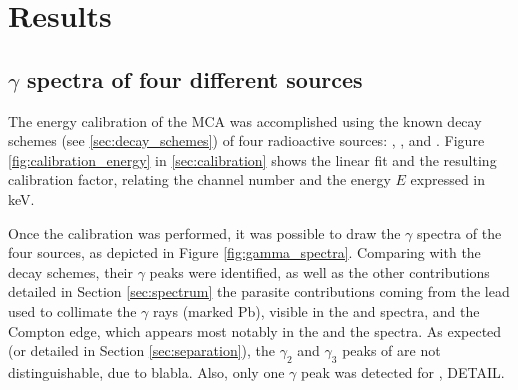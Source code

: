 \section{Results}
\subsection{$\gamma$ spectra of four different sources}
The energy calibration of the MCA was accomplished using the known decay 
schemes (see \autoref{sec:decay_schemes}) of four radioactive sources: 
\cesium, \cobalt, \lead and \hafnium.
Figure \ref{fig:calibration_energy} in \autoref{sec:calibration} 
shows the linear fit and the resulting calibration factor, 
relating the channel number and the energy $E$ expressed in keV.

Once the calibration was performed, it was possible to draw the $\gamma$ spectra 
of the four sources, as depicted in Figure \ref{fig:gamma_spectra}.
Comparing with the decay schemes, their $\gamma$ peaks were identified,
as well as the other contributions detailed in Section \ref{sec:spectrum}
the parasite contributions coming from the lead used to collimate 
the $\gamma$ rays (marked Pb), visible in the \cesium and \hafnium spectra, 
and the Compton edge, which appears most notably in the \cesium 
and the \lead spectra.
As expected (or detailed in Section \ref{sec:separation}), the $\gamma_2$ and $\gamma_3$ peaks of \cobalt are not distinguishable, due to blabla.
Also, only one $\gamma$ peak was detected for \hafnium, DETAIL.

